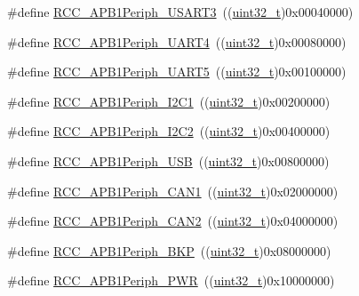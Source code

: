 \begin{DoxyCompactItemize}
\item 
\#define \hyperlink{group___a_p_b1__peripheral_gaf72838a63d7d6200f251c1eb334cbaac}{R\+C\+C\+\_\+\+A\+P\+B1\+Periph\+\_\+\+U\+S\+A\+R\+T3}~((\hyperlink{_p_e___types_8h_a33594304e786b158f3fb30289278f5af}{uint32\+\_\+t})0x00040000)
\item 
\#define \hyperlink{group___a_p_b1__peripheral_ga839d7ae3386622158210ecf53d9cd989}{R\+C\+C\+\_\+\+A\+P\+B1\+Periph\+\_\+\+U\+A\+R\+T4}~((\hyperlink{_p_e___types_8h_a33594304e786b158f3fb30289278f5af}{uint32\+\_\+t})0x00080000)
\item 
\#define \hyperlink{group___a_p_b1__peripheral_gaa00c73f88a7af45fb29df97b07acd856}{R\+C\+C\+\_\+\+A\+P\+B1\+Periph\+\_\+\+U\+A\+R\+T5}~((\hyperlink{_p_e___types_8h_a33594304e786b158f3fb30289278f5af}{uint32\+\_\+t})0x00100000)
\item 
\#define \hyperlink{group___a_p_b1__peripheral_ga594f87d504f7d63697d841033d1538f6}{R\+C\+C\+\_\+\+A\+P\+B1\+Periph\+\_\+\+I2\+C1}~((\hyperlink{_p_e___types_8h_a33594304e786b158f3fb30289278f5af}{uint32\+\_\+t})0x00200000)
\item 
\#define \hyperlink{group___a_p_b1__peripheral_ga8eaeded403b5a2277fbfb3896c639416}{R\+C\+C\+\_\+\+A\+P\+B1\+Periph\+\_\+\+I2\+C2}~((\hyperlink{_p_e___types_8h_a33594304e786b158f3fb30289278f5af}{uint32\+\_\+t})0x00400000)
\item 
\#define \hyperlink{group___a_p_b1__peripheral_ga69a1b3de9a59155bc8455eea5a15e3e4}{R\+C\+C\+\_\+\+A\+P\+B1\+Periph\+\_\+\+U\+SB}~((\hyperlink{_p_e___types_8h_a33594304e786b158f3fb30289278f5af}{uint32\+\_\+t})0x00800000)
\item 
\#define \hyperlink{group___a_p_b1__peripheral_ga7f1d940739de0134ae89e9e04214989d}{R\+C\+C\+\_\+\+A\+P\+B1\+Periph\+\_\+\+C\+A\+N1}~((\hyperlink{_p_e___types_8h_a33594304e786b158f3fb30289278f5af}{uint32\+\_\+t})0x02000000)
\item 
\#define \hyperlink{group___a_p_b1__peripheral_ga62801597b97816751c038acb1466179c}{R\+C\+C\+\_\+\+A\+P\+B1\+Periph\+\_\+\+C\+A\+N2}~((\hyperlink{_p_e___types_8h_a33594304e786b158f3fb30289278f5af}{uint32\+\_\+t})0x04000000)
\item 
\#define \hyperlink{group___a_p_b1__peripheral_ga2a26b65d0e38030e414a9d39276645b1}{R\+C\+C\+\_\+\+A\+P\+B1\+Periph\+\_\+\+B\+KP}~((\hyperlink{_p_e___types_8h_a33594304e786b158f3fb30289278f5af}{uint32\+\_\+t})0x08000000)
\item 
\#define \hyperlink{group___a_p_b1__peripheral_ga59ae4e17d5b35a934b1614f8ee883834}{R\+C\+C\+\_\+\+A\+P\+B1\+Periph\+\_\+\+P\+WR}~((\hyperlink{_p_e___types_8h_a33594304e786b158f3fb30289278f5af}{uint32\+\_\+t})0x10000000)

\end{DoxyCompactItemize}
